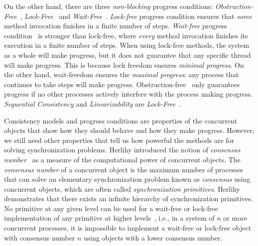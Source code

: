 On the other hand, there are three \textit{non-blocking} progress conditions: \textit{Obstruction-Free}~\cite{DBLP_conf_icdcs_HerlihyLM03}, \textit{Lock-Free}~\cite{DBLP_journals_toplas_HerlihyW90DBLP_journals_toplas_HerlihyW90} and \textit{Wait-Free}~\cite{DBLP_journals_toplas_Herlihy91}. 
\textit{Lock-free} progress condition ensures that \textit{some} method invocation finishes in a finite number of steps. \textit{Wait-free} progress condition~\cite{DBLP_journals_toplas_Herlihy91} is stronger than lock-free, where \textit{every} method invocation finishes its execution in a finite number of steps. When using lock-free methods, the system as a whole will make progress, but it does not guarantee that any specific thread will make progress. This is because lock freedom ensures \textit{minimal progress}. On the other hand, wait-freedom ensures the \textit{maximal progress}: any process that continues to take steps will make progress. Obstruction-free~\cite{DBLP_conf_icdcs_HerlihyLM03} only guarantees progress if no other processes actively interfere with the process making progress. \textit{Sequential Consistency} and \textit{Linearizability} are \textit{Lock-Free}~\cite{DBLP_journals_toplas_HerlihyW90DBLP_journals_toplas_HerlihyW90}.

Consistency models and progress conditions are properties of the concurrent objects that show how they should behave and how they make progress. However, we still need other properties that tell us how powerful the methods are for solving synchronization problems. Herlihy introduced the notion of \textit{consensus number}~\cite{DBLP_journals_toplas_Herlihy91} as a measure of the computational power of concurrent objects. The \textit{consensus number} of a concurrent object is the maximum number of processes that can solve an elementary synchronization problem known as \textit{consensus} using concurrent objects, which are often called \textit{synchronization primitives}. Herlihy demonstrates that there exists an infinite hierarchy of synchronization primitives. No primitive at any given level can be used for a wait-free or lock-free implementation of any primitive at higher levels~\cite{DBLP_journals_toplas_Herlihy91}, i.e., in a system of \(n\) or more concurrent processes, it is impossible to implement a wait-free or lock-free object with consensus number \(n\) using objects with a lower consensus number.

